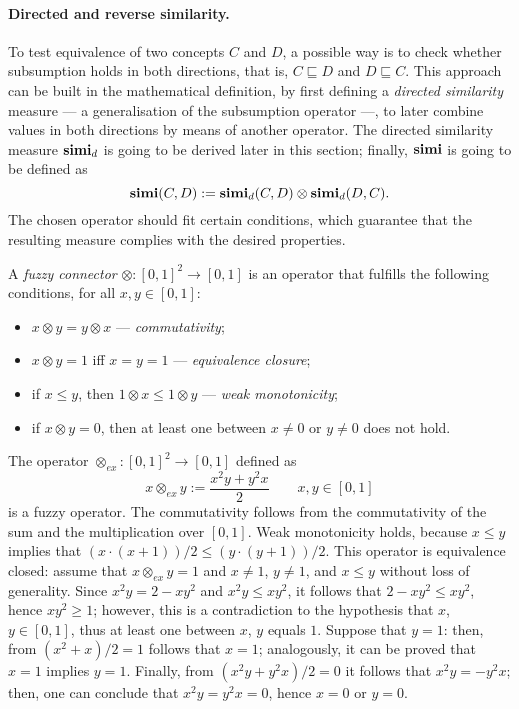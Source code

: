  \paragraph{Directed and reverse similarity.}
  To test equivalence of two concepts \(C\) and \(D\), a possible way is to check whether subsumption holds in both directions, that is, \(C \sqsubseteq D\) and \(D \sqsubseteq C\).
  This approach can be built in the mathematical definition, by first defining a \emph{directed similarity} measure --- a generalisation of the subsumption operator ---, to later combine values in both directions by means of another operator.
  The directed similarity measure \(\mathbf{simi}_d\) is going to be derived later in this section; finally, \(\mathbf{simi}\) is going to be defined as
  \begin{equation}
    \mathbf{simi}(C,D) := \mathbf{simi}_d(C,D) \otimes \mathbf{simi}_d(D,C).
  \end{equation} 
  The chosen operator should fit certain conditions, which guarantee that the resulting measure complies with the desired properties.
  \begin{definition}
    A \emph{fuzzy connector} \(\otimes \colon {[0,1]}^2 \to [0,1]\) is an operator that fulfills the following conditions, for all \(x, y \in [0,1]\):
    \begin{itemize}
      \item \(x \otimes y = y \otimes x\) --- \emph{commutativity};
      \item \(x \otimes y = 1\) iff \(x = y = 1\) --- \emph{equivalence closure};
      \item if \(x \le y\), then \(1 \otimes x \le 1 \otimes y\) --- \emph{weak monotonicity};
      \item if \(x \otimes y = 0\), then at least one between \(x \ne 0\) or \(y \ne 0\) does not hold.
    \end{itemize}
  \end{definition}

  \begin{example}
    The operator \(\otimes_{ex} \colon {[0,1]}^2 \to [0,1]\) defined as
    \[
    x \otimes_{ex} y := \frac{x^2y + y^2x}{2} \qquad x,y \in [0,1]
    \]
    is a fuzzy operator.
    The commutativity follows from the commutativity of the sum and the multiplication over \([0,1]\). Weak monotonicity holds, because \(x \le y\) implies that \((x \cdot (x+1))/2 \le (y \cdot (y+1))/2\).
    This operator is equivalence closed: assume that \(x \otimes_{ex} y = 1\) and \(x \ne 1\), \(y \ne 1\), and \(x \le y\) without loss of generality.
    Since \(x^2y = 2 - xy^2\) and \(x^2y \le xy^2\), it follows that \(2-xy^2 \le xy^2\), hence \(xy^2 \ge 1\); however, this is a contradiction to the hypothesis that \(x\), \(y \in [0,1]\), thus at least one between \(x\), \(y\) equals \(1\).
    Suppose that \(y = 1\): then, from \((x^2 + x)/2 = 1\) follows that \(x = 1\); analogously, it can be proved that \(x = 1\) implies \(y = 1\).
  Finally, from \((x^2y + y^2x)/2 = 0\) it follows that \(x^2y = - y^2x\); then, one can conclude that \(x^2y = y^2x = 0\), hence \(x = 0\) or \(y = 0\).
\end{example}
  
